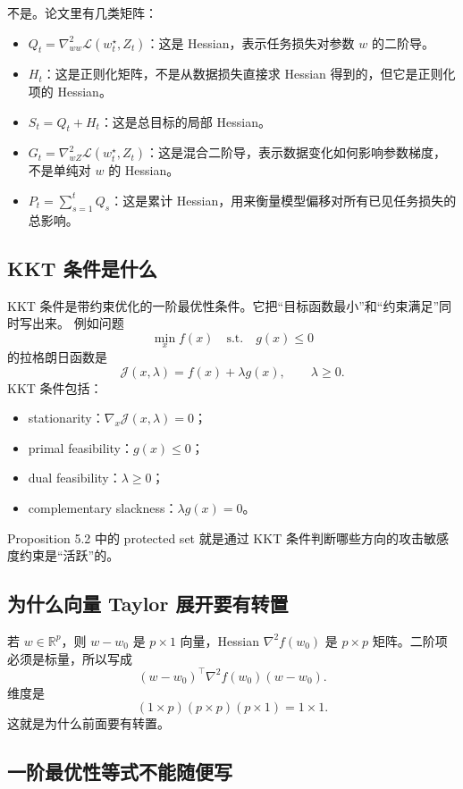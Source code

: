 \documentclass[UTF8,fontset=none,11pt]{ctexart}
\theoremstyle{cnstyle}
\newcommand{\R}{\mathbb{R}}
\newcommand{\calL}{\mathcal{L}}
\begin{document}
不是。论文里有几类矩阵：
\begin{itemize}
  \item \(Q_t=\nabla_{ww}^2\calL(w_t^\star,Z_t)\)：这是 Hessian，表示任务损失对参数 \(w\) 的二阶导。
  \item \(H_t\)：这是正则化矩阵，不是从数据损失直接求 Hessian 得到的，但它是正则化项的 Hessian。
  \item \(S_t=Q_t+H_t\)：这是总目标的局部 Hessian。
  \item \(G_t=\nabla_{wZ}^2\calL(w_t^\star,Z_t)\)：这是混合二阶导，表示数据变化如何影响参数梯度，不是单纯对 \(w\) 的 Hessian。
  \item \(P_t=\sum_{s=1}^tQ_s\)：这是累计 Hessian，用来衡量模型偏移对所有已见任务损失的总影响。
\end{itemize}

\subsection{KKT 条件是什么}

KKT 条件是带约束优化的一阶最优性条件。它把“目标函数最小”和“约束满足”同时写出来。
例如问题
\[
  \min_x f(x)\quad\text{s.t.}\quad g(x)\le0
\]
的拉格朗日函数是
\[
  \mathcal J(x,\lambda)=f(x)+\lambda g(x),\qquad \lambda\ge0.
\]
KKT 条件包括：
\begin{itemize}
  \item stationarity：\(\nabla_x\mathcal J(x,\lambda)=0\)；
  \item primal feasibility：\(g(x)\le0\)；
  \item dual feasibility：\(\lambda\ge0\)；
  \item complementary slackness：\(\lambda g(x)=0\)。
\end{itemize}
Proposition 5.2 中的 protected set 就是通过 KKT 条件判断哪些方向的攻击敏感度约束是“活跃”的。

\subsection{为什么向量 Taylor 展开要有转置}

若 \(w\in\R^p\)，则 \(w-w_0\) 是 \(p\times1\) 向量，Hessian \(\nabla^2f(w_0)\) 是 \(p\times p\) 矩阵。二阶项必须是标量，所以写成
\[
  (w-w_0)^\top\nabla^2f(w_0)(w-w_0).
\]
维度是
\[
  (1\times p)(p\times p)(p\times1)=1\times1.
\]
这就是为什么前面要有转置。

\subsection{一阶最优性等式不能随便写}
\end{document}

